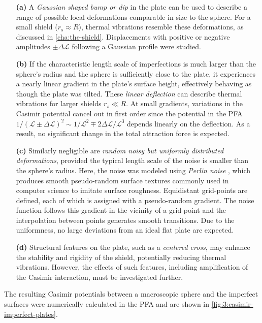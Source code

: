 \begin{enumerate}
  \item[\textbf{(a)}] A \textit{Gaussian shaped bump or dip} in the plate can be used to describe a range of possible local deformations comparable in size to the sphere. 
  For a small shield ($r_s \approx R$), thermal vibrations resemble these deformations, as discussed in \cref{cha:the-shield}.
  Displacements with positive or negative amplitudes $\pm \Delta \mathscr{L}$ following a Gaussian profile were studied.

  \item[\textbf{(b)}] If the characteristic length scale of imperfections is much larger than the sphere's radius and the sphere is sufficiently close to the plate, it experiences a nearly linear gradient in the plate's surface height, effectively behaving as though the plate was tilted. These \textit{linear deflection} can describe thermal vibrations for larger shields $r_s \ll R$. At small gradients, variations in the Casimir potential cancel out in first order since the potential in the PFA $1/(\mathscr{L} \pm \Delta \mathscr{L})^2 \sim 1/\mathscr{L}^2 \mp 2\Delta \mathscr{L}/\mathscr{L}^3$ depends linearly on the deflection. As a result, no significant change in the total attraction force is expected.
  
  \item[\textbf{(c)}] Similarly negligible are \textit{random noisy but uniformly distributed deformations}, provided the typical length scale of the noise is smaller than the sphere's radius. Here, the noise was modeled using \textit{Perlin noise} \cite{Perlin_1985}, which produces smooth pseudo-random surface textures commonly used in computer science to imitate surface roughness. Equidistant grid-points are defined, each of which is assigned with a pseudo-random gradient. The noise function follows this gradient in the vicinity of a grid-point and the interpolation between points generates smooth transitions. Due to the uniformness, no large deviations from an ideal flat plate are expected.
  
  \item[\textbf{(d)}] Structural features on the plate, such as a \textit{centered cross}, may enhance the stability and rigidity of the shield, potentially reducing thermal vibrations. However, the effects of such features, including amplification of the Casimir interaction, must be investigated further.
\end{enumerate}
The resulting Casimir potentials between a macroscopic sphere and the imperfect surfaces were numerically calculated in the PFA and are shown in \cref{fig:3:casimir-imperfect-plates}.
